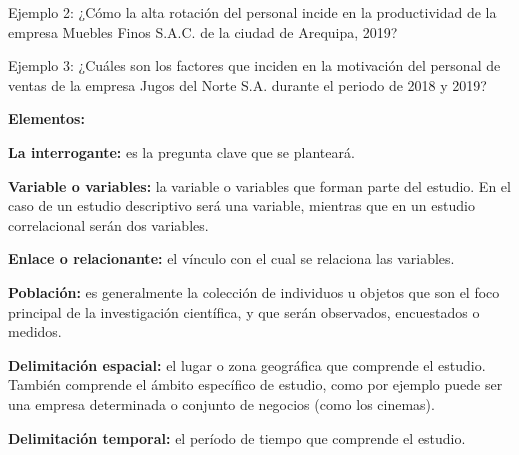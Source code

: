 Ejemplo 2: ¿Cómo la alta rotación del personal incide en la productividad de la empresa Muebles Finos S.A.C. de la ciudad de Arequipa, 2019?

Ejemplo 3: ¿Cuáles son los factores que inciden en la motivación del personal de ventas de la empresa Jugos del Norte S.A. durante el periodo de 2018 y 2019?

\textbf{Elementos:}

\textbf{La interrogante:} es la pregunta clave que se planteará.

\textbf{Variable o variables:} la variable o variables que forman parte del estudio. En el caso de un estudio descriptivo será una variable, mientras que en un estudio correlacional serán dos variables.

\textbf{Enlace o relacionante:} el vínculo con el cual se relaciona las variables.

\textbf{Población:} es generalmente la colección de individuos u objetos que son el foco principal de la investigación científica, y que serán observados, encuestados o medidos.

\textbf{Delimitación espacial:} el lugar o zona geográfica que comprende el estudio. También comprende el ámbito específico de estudio, como por ejemplo puede ser una empresa determinada o conjunto de negocios (como los cinemas).

\textbf{Delimitación temporal:} el período de tiempo que comprende el estudio.



